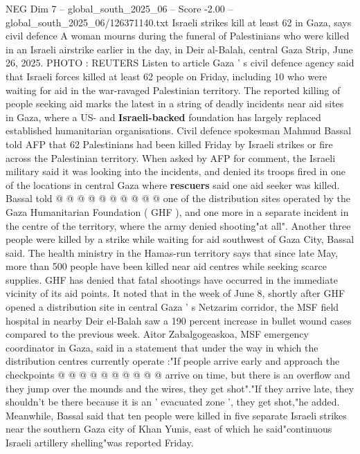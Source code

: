 \begin{textsample}{NEG Dim 7 – global\_south\_2025\_06 – Score -2.00 – global\_south\_2025\_06/126371140.txt}  \label{ex:f7_neg_059}
Israeli strikes kill at least 62 in Gaza, says civil defence A woman mourns during the funeral of Palestinians who were killed in an Israeli airstrike earlier in the day, in Deir al-Balah, central Gaza Strip, June 26, 2025.
PHOTO : REUTERS Listen to article Gaza ' s civil defence agency said that Israeli forces killed at least 62 people on Friday, including 10 who were waiting for aid in the war-ravaged Palestinian territory.
The reported killing of people seeking aid marks the latest in a string of deadly incidents near aid sites in Gaza, where a US- and \textbf{Israeli-backed} foundation has largely replaced established humanitarian organisations.
Civil defence spokesman Mahmud Bassal told AFP that 62 Palestinians had been killed Friday by Israeli strikes or fire across the Palestinian territory.
When asked by AFP for comment, the Israeli military said it was looking into the incidents, and denied its troops fired in one of the locations in central Gaza where \textbf{rescuers} said one aid seeker was killed.
Bassal told @ @ @ @ @ @ @ @ @ @ one of the distribution sites operated by the Gaza Humanitarian Foundation ( GHF ), and one more in a separate incident in the centre of the territory, where the army denied shooting"at all".
Another three people were killed by a strike while waiting for aid southwest of Gaza City, Bassal said.
The health ministry in the Hamas-run territory says that since late May, more than 500 people have been killed near aid centres while seeking scarce supplies.
GHF has denied that fatal shootings have occurred in the immediate vicinity of its aid points.
It noted that in the week of June 8, shortly after GHF opened a distribution site in central Gaza ' s Netzarim corridor, the MSF field hospital in nearby Deir el-Balah saw a 190 percent increase in bullet wound cases compared to the previous week.
Aitor Zabalgogeaskoa, MSF emergency coordinator in Gaza, said in a statement that under the way in which the distribution centres currently operate :"If people arrive early and approach the checkpoints @ @ @ @ @ @ @ @ @ @ arrive on time, but there is an overflow and they jump over the mounds and the wires, they get shot"."If they arrive late, they shouldn't be there because it is an ' evacuated zone ', they get shot,"he added.
Meanwhile, Bassal said that ten people were killed in five separate Israeli strikes near the southern Gaza city of Khan Yunis, east of which he said"continuous Israeli artillery shelling"was reported Friday.

\end{textsample}

